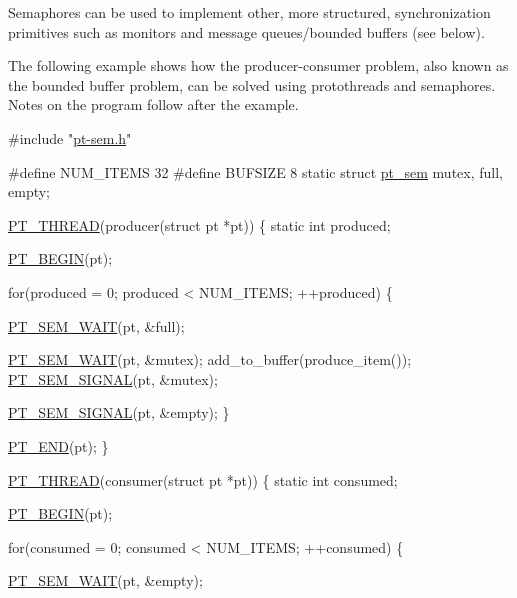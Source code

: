 Semaphores can be used to implement other, more structured, synchronization primitives such as monitors and message queues/bounded buffers (see below).

The following example shows how the producer-\/consumer problem, also known as the bounded buffer problem, can be solved using protothreads and semaphores. Notes on the program follow after the example.


\begin{DoxyCode}
\textcolor{preprocessor}{#include "\hyperlink{pt-sem_8h}{pt-sem.h}"}

\textcolor{preprocessor}{#define NUM\_ITEMS 32}
\textcolor{preprocessor}{}\textcolor{preprocessor}{#define BUFSIZE 8}
\textcolor{preprocessor}{}
\textcolor{keyword}{static} \textcolor{keyword}{struct }\hyperlink{structpt__sem}{pt\_sem} mutex, full, empty;

\hyperlink{group__pt_ga3d4c8bd4aada659eb34f5d2ffd3e7901}{PT\_THREAD}(producer(\textcolor{keyword}{struct} pt *pt))
\{
  \textcolor{keyword}{static} \textcolor{keywordtype}{int} produced;
  
  \hyperlink{group__pt_ga2ffbb9e554e08a343ae2f9de4bedfdfc}{PT\_BEGIN}(pt);
  
  \textcolor{keywordflow}{for}(produced = 0; produced < NUM\_ITEMS; ++produced) \{
  
    \hyperlink{group__ptsem_ga386ff87a52a840512906f2940e229e2e}{PT\_SEM\_WAIT}(pt, &full);
    
    \hyperlink{group__ptsem_ga386ff87a52a840512906f2940e229e2e}{PT\_SEM\_WAIT}(pt, &mutex);
    add\_to\_buffer(produce\_item());    
    \hyperlink{group__ptsem_ga1eaaf4d9d75e24582acc6440d7085f19}{PT\_SEM\_SIGNAL}(pt, &mutex);
    
    \hyperlink{group__ptsem_ga1eaaf4d9d75e24582acc6440d7085f19}{PT\_SEM\_SIGNAL}(pt, &empty);
  \}

  \hyperlink{group__pt_ga7b04a0035bef29d905496c23bae066d2}{PT\_END}(pt);
\}

\hyperlink{group__pt_ga3d4c8bd4aada659eb34f5d2ffd3e7901}{PT\_THREAD}(consumer(\textcolor{keyword}{struct} pt *pt))
\{
  \textcolor{keyword}{static} \textcolor{keywordtype}{int} consumed;
  
  \hyperlink{group__pt_ga2ffbb9e554e08a343ae2f9de4bedfdfc}{PT\_BEGIN}(pt);

  \textcolor{keywordflow}{for}(consumed = 0; consumed < NUM\_ITEMS; ++consumed) \{
    
    \hyperlink{group__ptsem_ga386ff87a52a840512906f2940e229e2e}{PT\_SEM\_WAIT}(pt, &empty);
    

\end{DoxyCode}
